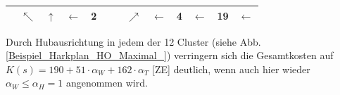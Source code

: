 \begin{center}
\begin{minipage}{\textwidth}
\begin{table}[H]
\begin{scriptsize}
\begin{tabular}{|>{}c|>{}c|>{}c|>{}c|>{}c|>{}c|>{}c|>{}c|>{}c|>{}c|>{}c|>{}c|>{}c|}
\hline
\cellcolor{gray!50!white}&\cellcolor{green!15!white}$\nwarrow$&\cellcolor{blue!15!white}$\uparrow$&\cellcolor{blue!15!white}$\leftarrow$&
\cellcolor{red!15!white}\bf{2}&\cellcolor{gray!50!white}&\cellcolor{gray!50!white}&$\nearrow$&$\leftarrow$&\cellcolor{green!15!white}\bf{4}&\cellcolor{green!15!white}$\leftarrow$&\bf{19}&$\leftarrow$ \\
\hline
\end{tabular}
\label{Beispiel_Harkplan_HO_Maximal}
\end{scriptsize} 
\end{table}
\renewcommand{\arraystretch}{1}
\end{minipage}
\end{center}

\noindent Durch Hubausrichtung in jedem der 12 Cluster (siehe Abb. \ref{Beispiel_Harkplan_HO_Maximal_}) verringern sich die Gesamtkosten auf $K(s) = 190 + 51 \cdot \alpha_W + 162 \cdot \alpha_T$ [ZE] deutlich, wenn auch hier wieder $\alpha_W \leq \alpha_H = 1$ angenommen wird.

